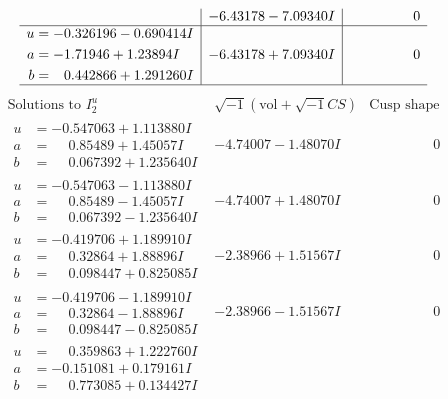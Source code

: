 \documentclass[1p]{elsarticle_modified}
\theoremstyle{definition}
\newcommand{\I}{\sqrt{-1}}
\begin{document}
$$\begin{array}{c|c|c}
 & -6.43178 - 7.09340 I & \phantom{-0.000000 } 0 \\ \hline\begin{aligned}
u &= -0.326196 - 0.690414 I \\
a &= -1.71946 + 1.23894 I \\
b &= \phantom{-}0.442866 + 1.291260 I\end{aligned}
 & -6.43178 + 7.09340 I & \phantom{-0.000000 } 0\\
 \hline 
 \end{array}$$\newpage$$\begin{array}{c|c|c}  
\text{Solutions to }I^u_{2}& \I (\text{vol} + \sqrt{-1}CS) & \text{Cusp shape}\\
 \hline 
\begin{aligned}
u &= -0.547063 + 1.113880 I \\
a &= \phantom{-}0.85489 + 1.45057 I \\
b &= \phantom{-}0.067392 + 1.235640 I\end{aligned}
 & -4.74007 - 1.48070 I & \phantom{-0.000000 } 0 \\ \hline\begin{aligned}
u &= -0.547063 - 1.113880 I \\
a &= \phantom{-}0.85489 - 1.45057 I \\
b &= \phantom{-}0.067392 - 1.235640 I\end{aligned}
 & -4.74007 + 1.48070 I & \phantom{-0.000000 } 0 \\ \hline\begin{aligned}
u &= -0.419706 + 1.189910 I \\
a &= \phantom{-}0.32864 + 1.88896 I \\
b &= \phantom{-}0.098447 + 0.825085 I\end{aligned}
 & -2.38966 + 1.51567 I & \phantom{-0.000000 } 0 \\ \hline\begin{aligned}
u &= -0.419706 - 1.189910 I \\
a &= \phantom{-}0.32864 - 1.88896 I \\
b &= \phantom{-}0.098447 - 0.825085 I\end{aligned}
 & -2.38966 - 1.51567 I & \phantom{-0.000000 } 0 \\ \hline\begin{aligned}
u &= \phantom{-}0.359863 + 1.222760 I \\
a &= -0.151081 + 0.179161 I \\
b &= \phantom{-}0.773085 + 0.134427 I\end{aligned}

\end{array}$$
\end{document}
